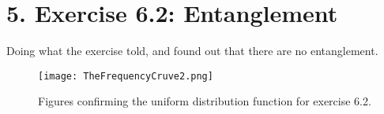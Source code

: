 \documentclass[12pt]{article}
\begin{document}
\part*{5. Exercise 6.2: Entanglement}
Doing what the exercise told, and found out that there are no entanglement. 
\begin{figure}[H]
	\texttt{[image: TheFrequencyCruve2.png]}
	\label{fig:mesh4}
	\caption{Figures confirming the uniform distribution function for exercise 6.2.}
\end{figure}
\end{document}
